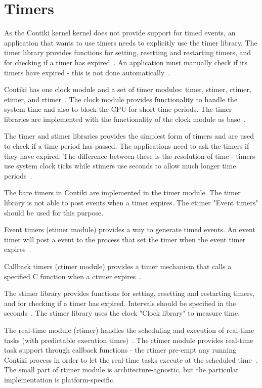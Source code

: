 
\section{Timers}\label{sec:contiki-timers}
As the Contiki kernel kernel does not provide support for timed events,
an application that wants to use timers needs to explicitly use the timer library.
The timer library provides functions for setting, resetting and restarting timers,
and for checking if a timer has expired~\cite{contiki-docs}.
An application must manually check if its timers have expired - this is not done automatically~\cite{contiki-docs}.

Contiki has one clock module and a set of timer modules: timer, stimer, ctimer, etimer, and rtimer~\cite{contiki-wiki-timers}.
The clock module provides functionality to handle the system time and also to block the CPU for short time periods.
The timer libraries are implemented with the functionality of the clock module as base~\cite{contiki-wiki-timers}.

The timer and stimer libraries provides the simplest form of timers and are used to check if a time period has passed.
The applications need to ask the timers if they have expired.
The difference between these is the resolution of time -
timers use system clock ticks while stimers use seconds to allow much longer time periods~\cite{contiki-wiki-timers}.

The bare timers in Contiki are implemented in the timer module.
The timer library is not able to post events when a timer
expires. The etimer "Event timers" should be used for this
purpose.


Event timers (etimer module) provides a way to generate timed events.
An event timer will post a event to the process that set the timer when the
event timer expires~\cite{contiki-docs}.

Callback timers (ctimer module) provides a timer mechanism that calls a specified
C function when a ctimer expires~\cite{contiki-docs}.

The stimer library provides functions for setting, resetting and
restarting timers, and for checking if a timer has expired.
Intervals should be specified in the seconds~\cite{contiki-docs}.
The stimer library uses the clock "Clock library" to
measure time.

The real-time module (rtimer) handles the scheduling and execution of
real-time tasks (with predictable execution times)~\cite{contiki-docs}.
The rtimer module provides real-time task support through callback functions -
the rtimer pre-empt any running Contiki process in order to let the real-time tasks
execute at the scheduled time~\cite{contiki-wiki-timers}.
The small part of rtimer module is architecture-agnostic,
but the particular implementation is platform-specific.




